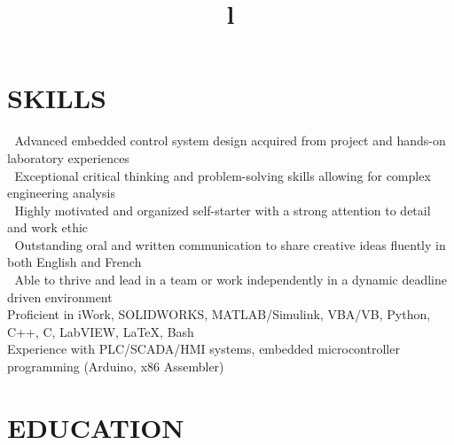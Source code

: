 \documentclass[mm]{res}
\newcommand{\tb}{\textbullet \xspace}
\newcommand{\toprule}{\noindent\makebox[\linewidth]{\rule{\paperwidth}{0.25pt}}}
\begin{document}

\fontsize{8pt}{10pt}\selectfont


\address{Cupertino, CA, USA}
\address{s3blanch@edu.uwaterloo.ca}
\address{(669)-241-8438}


\begin{resume}


\section{SKILLS \xspace}
􏰚\tb Advanced embedded control system design acquired from project and hands-on laboratory experiences \\
􏰚\tb Exceptional critical thinking and problem-solving skills allowing for complex engineering analysis \\
􏰚\tb Highly motivated and organized self-starter with a strong attention to detail and work ethic \\
􏰚\tb Outstanding oral and written communication to share creative ideas fluently in both English and French \\
􏰚\tb Able to thrive and lead in a team or work independently in a dynamic deadline driven environment \\
\tb Proficient in iWork, SOLIDWORKS, MATLAB/Simulink, VBA/VB, Python, C++, C, LabVIEW, \LaTeX \xspace , Bash \\
\tb Experience with PLC/SCADA/HMI systems, embedded microcontroller programming (Arduino, x86 Assembler)

\section{EDUCATION \xspace}
\begin{format}
\\
\title{l}\\
\end{format}


\end{resume}
\end{document}
